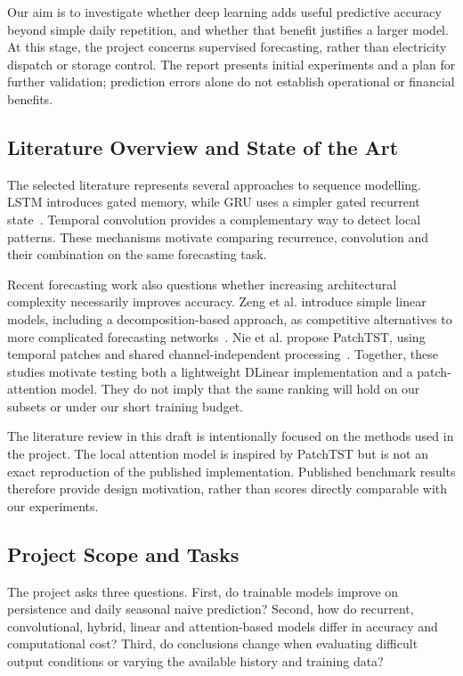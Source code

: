 \documentclass[11pt,a4paper]{article}
\begin{document}
Our aim is to investigate whether deep learning adds useful predictive accuracy beyond simple daily repetition, and whether that benefit justifies a larger model. At this stage, the project concerns supervised forecasting, rather than electricity dispatch or storage control. The report presents initial experiments and a plan for further validation; prediction errors alone do not establish operational or financial benefits.

\subsection{Literature Overview and State of the Art}
The selected literature represents several approaches to sequence modelling. LSTM introduces gated memory, while GRU uses a simpler gated recurrent state~\cite{lstm,gru}. Temporal convolution provides a complementary way to detect local patterns. These mechanisms motivate comparing recurrence, convolution and their combination on the same forecasting task.

Recent forecasting work also questions whether increasing architectural complexity necessarily improves accuracy. Zeng et al. introduce simple linear models, including a decomposition-based approach, as competitive alternatives to more complicated forecasting networks~\cite{dlinear}. Nie et al. propose PatchTST, using temporal patches and shared channel-independent processing~\cite{patch}. Together, these studies motivate testing both a lightweight DLinear implementation and a patch-attention model. They do not imply that the same ranking will hold on our subsets or under our short training budget.

The literature review in this draft is intentionally focused on the methods used in the project. The local attention model is inspired by PatchTST but is not an exact reproduction of the published implementation. Published benchmark results therefore provide design motivation, rather than scores directly comparable with our experiments.

\subsection{Project Scope and Tasks}
The project asks three questions. First, do trainable models improve on persistence and daily seasonal naive prediction? Second, how do recurrent, convolutional, hybrid, linear and attention-based models differ in accuracy and computational cost? Third, do conclusions change when evaluating difficult output conditions or varying the available history and training data?
\end{document}
